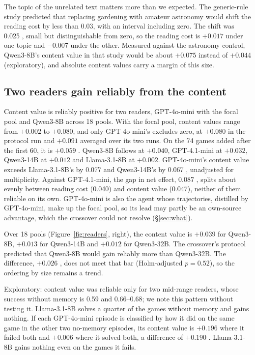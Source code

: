 The topic of the unrelated text matters more than we expected. The generic-rule study predicted that
replacing gardening with amateur astronomy would shift the reading cost by less than 0.03, with an
interval including zero. The shift was 0.025 , small but distinguishable from zero, so
the reading cost is $+0.017$  under one topic and $-0.007$  under the
other. Measured against the astronomy control, Qwen3-8B's content value in that study would be about
$+0.075$ instead of $+0.044$ (exploratory), and absolute content values carry a margin of this size.

\subsection{Two readers gain reliably from the content}
\label{sec:reader}

Content value is reliably positive for two readers, GPT-4o-mini with the focal pool and Qwen3-8B across
18 pools. With the focal pool, content values range from $+0.002$ to $+0.080$, and only GPT-4o-mini's
excludes zero, at $+0.080$  in the protocol run and $+0.091$  averaged
over its two runs. On the 74 games added after the first 60, it is $+0.059$ .
Qwen3-8B follows at $+0.040$, GPT-4.1-mini at $+0.032$, Qwen3-14B at $+0.012$ and Llama-3.1-8B at
$+0.002$. GPT-4o-mini's content value exceeds Llama-3.1-8B's by 0.077  and Qwen3-14B's
by 0.067 , unadjusted for multiplicity. Against GPT-4.1-mini, the gap in net effect,
0.087 , splits about evenly between reading cost (0.040) and content value (0.047),
neither of them reliable on its own. GPT-4o-mini is also the agent whose trajectories, distilled by
GPT-4o-mini, make up the focal pool, so its lead may partly be an own-source advantage, which the
crossover could not resolve (\S\ref{sec:what}).

Over 18 pools (Figure~\ref{fig:readers}, right), the content value is $+0.039$  for
Qwen3-8B, $+0.013$  for Qwen3-14B and $+0.012$  for Qwen3-32B. The
crossover's protocol predicted that Qwen3-8B would gain reliably more than Qwen3-32B. The difference,
$+0.026$ , does not meet that bar (Holm-adjusted $p=0.52$), so the ordering by size
remains a trend.

Exploratory: content value was reliable only for two mid-range readers, whose success without memory is
0.59 and 0.66--0.68; we note this pattern without testing it. Llama-3.1-8B solves a quarter of the games
without memory and gains nothing. If each GPT-4o-mini episode is classified by how it did on the same game
in the other two no-memory episodes, its content value is $+0.196$ where it failed both and $+0.006$ where
it solved both, a difference of $+0.190$ . Llama-3.1-8B gains nothing even on the
games it fails.


